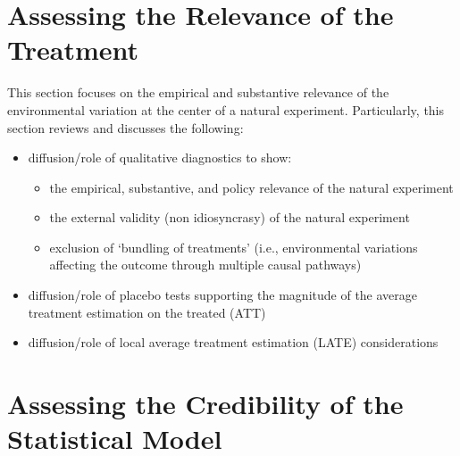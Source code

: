 \documentclass[nobib]{tufte-handout}
\begin{document}
\begin{refsection}
\section{Assessing the Relevance of the Treatment}

\noindent This section focuses on the empirical and substantive relevance of the
environmental variation at the center of a natural experiment.  Particularly,
this section reviews and discusses the following:

\begin{itemize}
    \item diffusion/role of qualitative diagnostics to show:
        \begin{itemize}
            \item the empirical, substantive, and policy relevance of the
                natural experiment
            \item the external validity (non idiosyncrasy) of the natural
                experiment
            \item exclusion of `bundling of treatments' (i.e., environmental
                variations affecting the outcome through multiple causal
                pathways)
        \end{itemize}
    \item diffusion/role of placebo tests supporting the magnitude of the
        average treatment estimation on the treated  (ATT)
    \item diffusion/role of local average treatment estimation (LATE) 
        considerations
\end{itemize}

%
%
%
%
%
%
%
%
%
%
%

\section{Assessing the Credibility of the Statistical Model}


\end{refsection}
\end{document}
